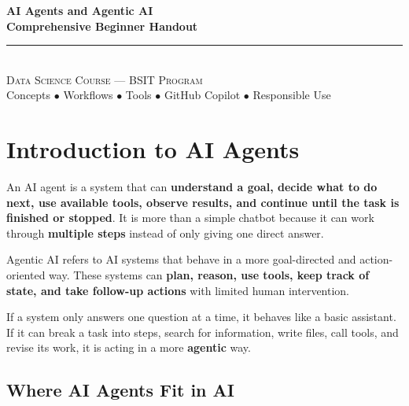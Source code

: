 \documentclass[11pt,a4paper]{article}
\begin{document}
\begin{center}
\vspace*{0.5cm}
{\Huge\bfseries\textcolor{primary}{AI Agents and Agentic AI}}\\[8pt]
{\Huge\bfseries\textcolor{primary}{Comprehensive Beginner Handout}}\\[16pt]
{\color{secondary}\rule{0.68\textwidth}{1.5pt}}\\[14pt]
{\Large\textsc{Data Science Course --- BSIT Program}}\\[8pt]
{\large\textcolor{gray!70!black}{Concepts $\bullet$ Workflows $\bullet$ Tools $\bullet$ GitHub Copilot $\bullet$ Responsible Use}}
\vspace{0.3cm}
\end{center}

\tableofcontents
\newpage

\section{Introduction to AI Agents}

\begin{definitionbox}[AI Agent]
An AI agent is a system that can \textbf{understand a goal, decide what to do next, use available tools, observe results, and continue until the task is finished or stopped}. It is more than a simple chatbot because it can work through \textbf{multiple steps} instead of only giving one direct answer.
\end{definitionbox}

\begin{definitionbox}[Agentic AI]
Agentic AI refers to AI systems that behave in a more goal-directed and action-oriented way. These systems can \textbf{plan, reason, use tools, keep track of state, and take follow-up actions} with limited human intervention.
\end{definitionbox}

\begin{conceptbox}
If a system only answers one question at a time, it behaves like a basic assistant. If it can break a task into steps, search for information, write files, call tools, and revise its work, it is acting in a more \textbf{agentic} way.
\end{conceptbox}

\subsection{Where AI Agents Fit in AI}
\end{document}
